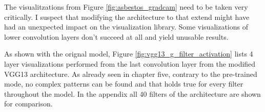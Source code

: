 \begin{figure}[H]
{}
\label{fig:asbestos_gradcam_g}
\end{figure}

The visualitzations from Figure \ref{fig:asbestos_gradcam} need to be taken very critically. I suspect that modifying the architecture to that extend might have had an unexpected impact on the visualization library. Some visualizations of lower convolution layers don't succeed at all and yield unusable results.

As shown with the orignal model, Figure \ref{fig:vgg13_g_filter_activation} lists 4 layer visualizations performed from the last convolution layer from the modified VGG13 architecture. As already seen in chapter five, contrary to the pre-trained mode, no complex patterns can be found and that holds true for every filter throughout the model. In the appendix all 40 filters of the architecture are shown for comparison.

